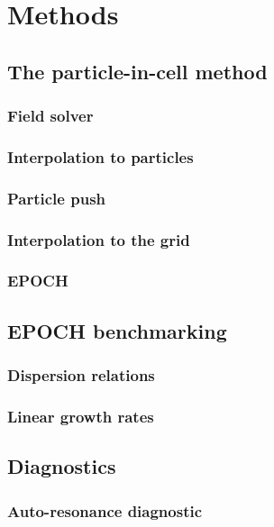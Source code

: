 \chapter{Methods}
\label{chp:methods}

\section{The particle-in-cell method}
\subsection{Field solver}
\subsection{Interpolation to particles}
\subsection{Particle push}
\subsection{Interpolation to the grid}
\subsection{EPOCH}


\section{EPOCH benchmarking}
\subsection{Dispersion relations}
\subsection{Linear growth rates}




\section{Diagnostics}
\subsection{Auto-resonance diagnostic}